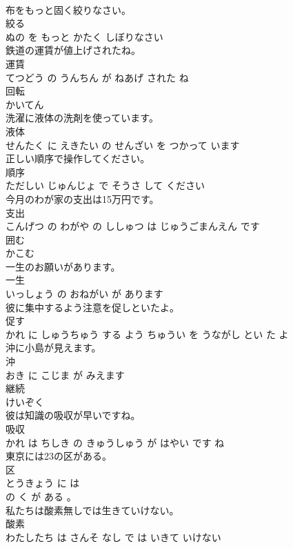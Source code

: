\documentclass[8pt]{extreport}
\begin{document}
\begin{CJK}{UTF8}{min}
\\	布をもっと固く絞りなさい。	
\\	絞る 
\\	ぬの を もっと かたく しぼりなさい		
\\	鉄道の運賃が値上げされたね。	
\\	運賃 
\\	てつどう の うんちん が ねあげ された ね		
\\	回転	
\\	かいてん		
\\	洗濯に液体の洗剤を使っています。	
\\	液体 
\\	せんたく に えきたい の せんざい を つかって います		
\\	正しい順序で操作してください。	
\\	順序 
\\	ただしい じゅんじょ で そうさ して ください		
\\	今月のわが家の支出は15万円です。	
\\	支出 
\\	こんげつ の わがや の ししゅつ は じゅうごまんえん です		
\\	囲む	
\\	かこむ		
\\	一生のお願いがあります。	
\\	一生 
\\	いっしょう の おねがい が あります		
\\	彼に集中するよう注意を促しといたよ。	
\\	促す 
\\	かれ に しゅうちゅう する よう ちゅうい を うながし とい た よ		
\\	沖に小島が見えます。	
\\	沖 
\\	おき に こじま が みえます		
\\	継続	
\\	けいぞく		
\\	彼は知識の吸収が早いですね。	
\\	吸収 
\\	かれ は ちしき の きゅうしゅう が はやい です ね		
\\	東京には23の区がある。	
\\	区 
\\	とうきょう に は 
\\	の く が ある 。		
\\	私たちは酸素無しでは生きていけない。	
\\	酸素 
\\	わたしたち は さんそ なし で は いきて いけない		

\end{CJK}
\end{document}
